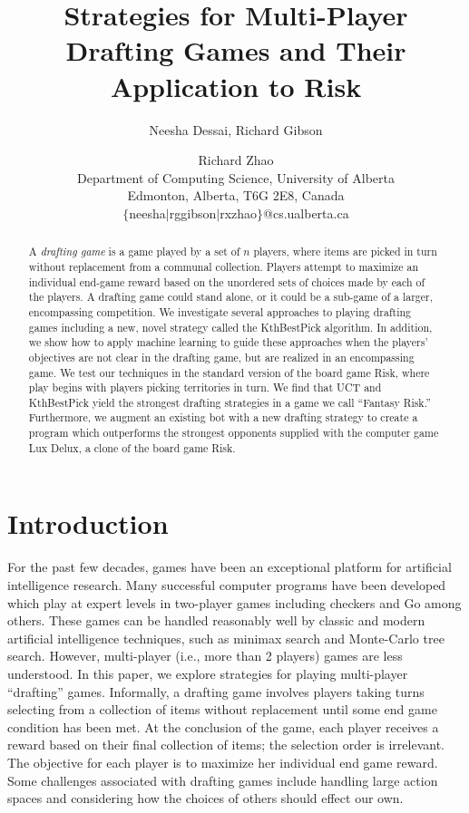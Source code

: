 \documentclass[letterpaper]{article}
\title{Strategies for Multi-Player Drafting Games and Their Application to Risk}
\author{Neesha Dessai, Richard Gibson \and Richard Zhao \\
Department of Computing Science, University of Alberta \\
Edmonton, Alberta, T6G 2E8, Canada \\
$\{$neesha$\mid$rggibson$\mid$rxzhao$\}$@cs.ualberta.ca}
\numberwithin{equation}{section}
\numberwithin{theorem}{section}
\numberwithin{lemma}{section}
\numberwithin{df}{section}
\begin{document}
\maketitle

\begin{abstract}
A \emph{drafting game} is a game played by a set of $n$ players, where items are picked in turn without replacement from a communal collection.  Players attempt to maximize an individual end-game reward based on the unordered sets of choices made by each of the players.  A drafting game could stand alone, or it could be a sub-game of a larger, encompassing competition.  We investigate several approaches to playing drafting games including a new, novel strategy called the KthBestPick algorithm.  In addition, we show how to apply machine learning to guide these approaches when the players' objectives are not clear in the drafting game, but are realized in an encompassing game.  We test our techniques in the standard version of the board game Risk, where play begins with players picking territories in turn.  We find that UCT and KthBestPick yield the strongest drafting strategies in a game we call ``Fantasy Risk.''  Furthermore, we augment an existing bot with a new drafting strategy to create a program which outperforms the strongest opponents supplied with the computer game Lux Delux, a clone of the board game Risk.
\end{abstract}

\section{Introduction}


For the past few decades, games have been an exceptional platform for artificial intelligence research.  Many successful computer programs have been developed which play at expert levels in two-player games including %
checkers \cite{Chinook} %
and Go \cite{ComputerGo} among others.  These games can be handled reasonably well by classic and modern artificial intelligence techniques, such as minimax search and Monte-Carlo tree search.  However, multi-player (i.e., more than 2 players) games are less understood.  In this paper, we explore strategies for playing multi-player ``drafting'' games.  Informally, a drafting game involves players taking turns selecting from a collection of items without replacement until some end game condition has been met.  At the conclusion of the game, each player receives a reward based on their final collection of items; the selection order is irrelevant.  The objective for each player is to maximize her individual end game reward.  Some challenges associated with drafting games include handling large action spaces and considering how the choices of others should effect our own.
\end{document}
